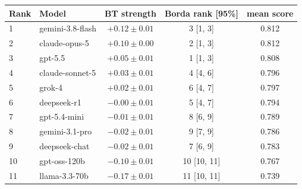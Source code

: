 \begin{tabular}{llccc}
\toprule
Rank & Model & BT strength & Borda rank [95\%] & mean score \\
\midrule
1 & gemini-3.8-flash & $+0.12 \pm 0.01$ & 3 [1, 3] & 0.812 \\
2 & claude-opus-5 & $+0.10 \pm 0.00$ & 2 [1, 3] & 0.812 \\
3 & gpt-5.5 & $+0.05 \pm 0.01$ & 1 [1, 3] & 0.808 \\
4 & claude-sonnet-5 & $+0.03 \pm 0.01$ & 4 [4, 6] & 0.796 \\
5 & grok-4 & $+0.02 \pm 0.01$ & 6 [4, 7] & 0.797 \\
6 & deepseek-r1 & $-0.00 \pm 0.01$ & 5 [4, 7] & 0.794 \\
7 & gpt-5.4-mini & $-0.01 \pm 0.01$ & 8 [6, 9] & 0.789 \\
8 & gemini-3.1-pro & $-0.02 \pm 0.01$ & 9 [7, 9] & 0.786 \\
9 & deepseek-chat & $-0.02 \pm 0.01$ & 7 [6, 9] & 0.783 \\
10 & gpt-oss-120b & $-0.10 \pm 0.01$ & 10 [10, 11] & 0.767 \\
11 & llama-3.3-70b & $-0.17 \pm 0.01$ & 11 [10, 11] & 0.739 \\
\bottomrule
\end{tabular}
